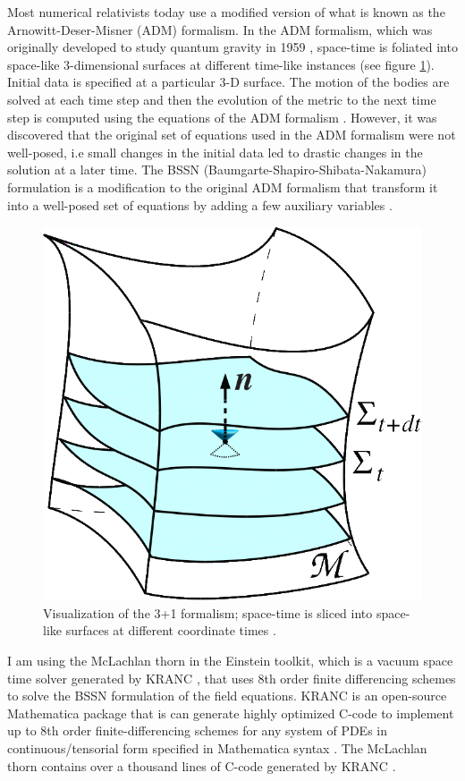 \documentclass[aps,twocolumn,secnumarabic,nobalancelastpage,amsmath,amssymb,
nofootinbib]{revtex4}
\begin{document}
	Most numerical relativists today use a modified version of what is known as the Arnowitt-Deser-Misner (ADM) formalism. In the ADM formalism, which was originally developed to study quantum gravity in 1959 \cite{living}, space-time is foliated into space-like 3-dimensional surfaces at different time-like instances (see figure \ref{3+2}). Initial data is specified at a particular 3-D surface. The motion of the bodies are solved at each time step and then the evolution of the metric to the next time step is computed using the equations of the ADM formalism \cite{3+1}. However, it was discovered that the original set of equations used in the ADM formalism were not well-posed, i.e small changes in the initial data led to drastic changes in the solution at a later time. The BSSN (Baumgarte-Shapiro-Shibata-Nakamura) formulation is a modification to the original ADM formalism that transform it into a well-posed set of equations by adding a few auxiliary variables \cite{BS}.
		\newline
		
		\begin{figure}[h]
			\includegraphics[width=.8\linewidth]{3+1.png}
			\caption{Visualization of the 3+1 formalism; space-time is sliced into space-like surfaces at different coordinate times \cite{3+2}.}
			\label{3+2}
		\end{figure}
	
	
	I am using the McLachlan thorn in the Einstein toolkit, which is a vacuum space time solver generated by KRANC \cite{kranc}, that uses 8th order finite differencing schemes to solve the BSSN formulation of the field equations. KRANC is an open-source Mathematica package that is can generate highly optimized C-code to implement up to 8th order finite-differencing schemes for any system of PDEs in continuous/tensorial form specified in Mathematica syntax \cite{kranc}. The McLachlan thorn contains over a thousand lines of C-code generated by KRANC \cite{intro}.
	
\end{document}
